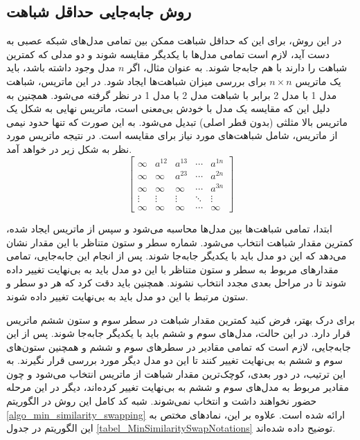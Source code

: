 \subsection{
	روش جابه‌جایی حداقل شباهت%
}
در این روش، برای این که حداقل شباهت ممکن بین تمامی مدل‌های شبکه عصبی به دست آید، لازم است تمامی مدل‌ها با یکدیگر مقایسه شوند و دو مدلی که کمترین شباهت را دارند با هم جابه‌جا شوند. به عنوان مثال، اگر \( n \) مدل وجود داشته باشد، باید یک ماتریس \( n \times n \) برای بررسی میزان شباهت‌ها ایجاد شود. در این ماتریس، شباهت مدل 1 با مدل 2 برابر با شباهت مدل 2 با مدل 1 در نظر گرفته می‌شود. همچنین به دلیل این که مقایسه یک مدل با خودش بی‌معنی است، ماتریس نهایی به شکل یک ماتریس بالا مثلثی%
(بدون قطر اصلی) تبدیل می‌شود. به این صورت که تنها حدود نیمی از ماتریس، شامل شباهت‌های مورد نیاز برای مقایسه است. در نتیجه ماتریس مورد نظر به شکل زیر در خواهد آمد.
\begin{equation}
	\begin{bmatrix}
		\infty & a^{12} & a^{13} & \cdots & a^{1n} \\
		\infty & \infty & a^{23} & \cdots & a^{2n} \\
		\infty & \infty & \infty & \cdots & a^{3n} \\
		\vdots & \vdots & \vdots & \ddots & \vdots \\
		\infty & \infty & \infty & \cdots & \infty
	\end{bmatrix}
	\label{eq_similarity_matrix}
\end{equation}

ابتدا، تمامی شباهت‌ها بین مدل‌ها محاسبه می‌شود و سپس از ماتریس ایجاد شده، کمترین مقدار شباهت انتخاب می‌شود. شماره سطر و ستون متناظر با این مقدار نشان می‌دهد که این دو مدل باید با یکدیگر جابه‌جا شوند. پس از انجام این جابه‌جایی، تمامی مقدارهای مربوط به سطر و ستون متناظر با این دو مدل باید به بی‌نهایت تغییر داده شوند تا در مراحل بعدی مجدد انتخاب نشوند. همچنین باید دقت کرد که هر دو سطر و ستون مرتبط با این دو مدل باید به بی‌نهایت تغییر داده شوند.

برای درک بهتر، فرض کنید کمترین مقدار شباهت در سطر سوم و ستون ششم ماتریس قرار دارد. در این حالت، مدل‌های سوم و ششم باید با یکدیگر جابه‌جا شوند. پس از این جابه‌جایی، لازم است که تمامی مقادیر در سطرهای سوم و ششم و همچنین ستون‌های سوم و ششم به بی‌نهایت تغییر کنند تا این دو مدل دیگر مورد بررسی قرار نگیرند. به این ترتیب، در دور بعدی، کوچک‌ترین مقدار شباهت از ماتریس انتخاب می‌شود و چون مقادیر مربوط به مدل‌های سوم و ششم به بی‌نهایت تغییر کرده‌اند، دیگر در این مرحله حضور نخواهند داشت و انتخاب نمی‌شوند. شبه کد کامل این روش در الگوریتم
\ref{algo_min_similarity_swapping}
ارائه شده است. علاوه بر این، نمادهای مختص به این الگوریتم در جدول
\ref{tabel_MinSimilaritySwapNotations}
توضیح داده شده‌اند.


